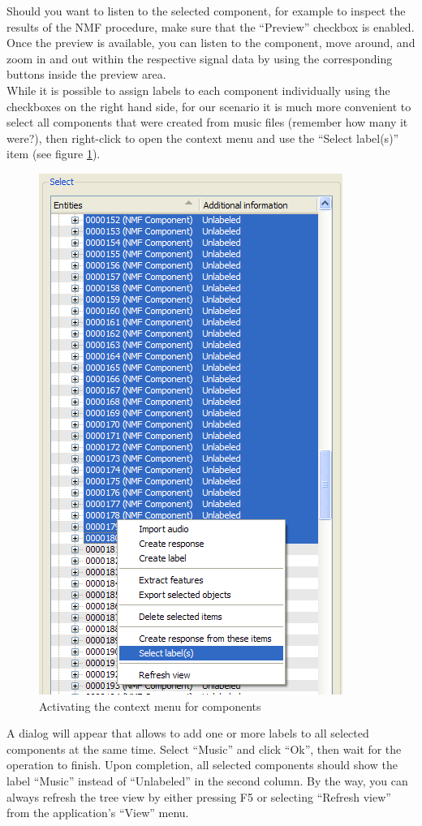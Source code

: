 Should you want to listen to the selected component, for example to inspect the
results of the NMF procedure, make sure that the ``Preview'' checkbox is
enabled. Once the preview is available, you can listen to the component, move
around, and zoom in and out within the respective signal data by using the
corresponding buttons inside the preview area.\\

While it is possible to assign labels to each component individually using the
checkboxes on the right hand side, for our scenario it is much more convenient
to select all components that were created from music files (remember how many
it were?), then right-click to open the context menu and use the ``Select
label(s)'' item (see figure \ref{figure:TutorialSelectLabels}).

\begin{figure}
    \centering
    \includegraphics[width=.6\textwidth]{tutorial-media/SelectLabels.png}
    \caption{%
        \label{figure:TutorialSelectLabels}%
        Activating the context menu for components
    }
\end{figure}

A dialog will appear that allows to add one or more labels to all selected
components at the same time. Select ``Music'' and click ``Ok'', then wait for
the operation to finish. Upon completion, all selected components should show
the label ``Music'' instead of ``Unlabeled'' in the second column. By the way,
you can always refresh the tree view by either pressing F5 or selecting
``Refresh view'' from the application's ``View'' menu.\\


